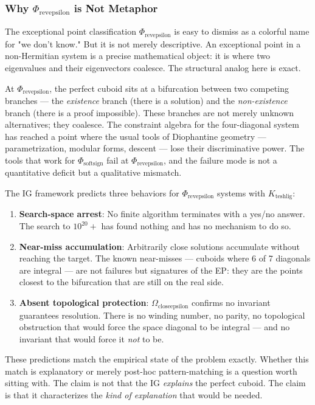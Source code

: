 \documentclass[12pt,a4paper]{article}
\begin{document}
\subsubsection{Why $\Phi_{\text{revepsilon}}$ is Not Metaphor}

The exceptional point classification $\Phi_{\text{revepsilon}}$ is easy to dismiss as a colorful name for "we don't know." But it is not merely descriptive. An exceptional point in a non-Hermitian system is a precise mathematical object: it is where two eigenvalues and their eigenvectors coalesce. The structural analog here is exact.

At $\Phi_{\text{revepsilon}}$, the perfect cuboid sits at a bifurcation between two competing branches --- the \emph{existence} branch (there is a solution) and the \emph{non-existence} branch (there is a proof impossible). These branches are not merely unknown alternatives; they coalesce. The constraint algebra for the four-diagonal system has reached a point where the usual tools of Diophantine geometry --- parametrization, modular forms, descent --- lose their discriminative power. The tools that work for $\Phi_{\text{softsign}}$ fail at $\Phi_{\text{revepsilon}}$, and the failure mode is not a quantitative deficit but a qualitative mismatch.

The IG framework predicts three behaviors for $\Phi_{\text{revepsilon}}$ systems with $K_{\text{teshlig}}$:

\begin{enumerate}
    \item \textbf{Search-space arrest}: No finite algorithm terminates with a yes/no answer. The search to $10^{20}+$ has found nothing and has no mechanism to do so.
    \item \textbf{Near-miss accumulation}: Arbitrarily close solutions accumulate without reaching the target. The known near-misses --- cuboids where 6 of 7 diagonals are integral --- are not failures but signatures of the EP: they are the points closest to the bifurcation that are still on the real side.
    \item \textbf{Absent topological protection}: $\Omega_{\text{closeepsilon}}$ confirms no invariant guarantees resolution. There is no winding number, no parity, no topological obstruction that would force the space diagonal to be integral --- and no invariant that would force it \emph{not} to be.
\end{enumerate}

These predictions match the empirical state of the problem exactly. Whether this match is explanatory or merely post-hoc pattern-matching is a question worth sitting with. The claim is not that the IG \emph{explains} the perfect cuboid. The claim is that it characterizes the \emph{kind of explanation} that would be needed.
\end{document}
